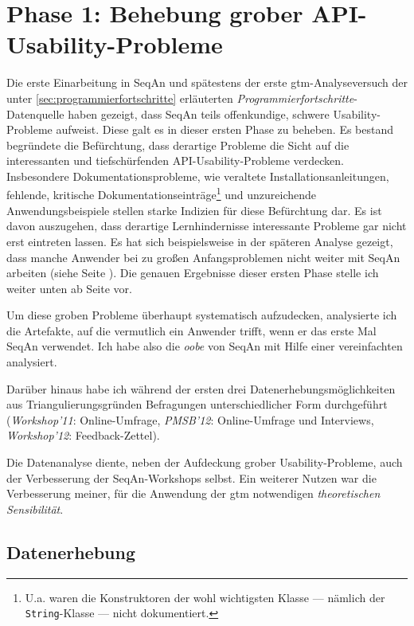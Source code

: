 \section{Phase 1: Behebung grober API-Usability-Probleme}
\label{sec:phase1}

Die erste Einarbeitung in SeqAn und spätestens der erste \gls{gtm}-Analyseversuch der unter \ref{sec:programmierfortschritte} erläuterten \textit{Programmierfortschritte}-Datenquelle haben gezeigt, dass SeqAn teils offenkundige, schwere Usability-Probleme aufweist. Diese galt es in dieser ersten Phase zu beheben. Es bestand begründete die Befürchtung, dass derartige Probleme die Sicht auf die interessanten und tiefschürfenden API-Usability-Probleme verdecken. Insbesondere Dokumentationsprobleme, wie veraltete Installationsanleitungen, fehlende, kritische Dokumentationseinträge\footnote{U.a. waren die Konstruktoren der wohl wichtigsten Klasse --- nämlich der \texttt{String}-Klasse --- nicht dokumentiert.} und unzureichende Anwendungsbeispiele stellen starke Indizien für diese Befürchtung dar. Es ist davon auszugehen, dass derartige Lernhindernisse interessante Probleme gar nicht erst eintreten lassen. Es hat sich beispielsweise in der späteren Analyse gezeigt, dass manche Anwender bei zu großen Anfangsproblemen nicht weiter mit SeqAn arbeiten (siehe Seite \pageref{sec:gt-seqan-alternative}). Die genauen Ergebnisse dieser ersten Phase stelle ich weiter unten ab Seite \pageref{sec:phase1-ergebnisse} vor.

Um diese groben Probleme überhaupt systematisch aufzudecken, analysierte ich die Artefakte, auf die vermutlich ein Anwender trifft, wenn er das erste Mal SeqAn verwendet. Ich habe also die \textit{\gls{oobe}} \citep{Fouts:2000:SLE:353360.353375} von SeqAn mit Hilfe einer vereinfachten \textit{} analysiert.

Darüber hinaus habe ich während der ersten drei Datenerhebungsmöglichkeiten aus Triangulierungsgründen Befragungen unterschiedlicher Form durchgeführt (\textit{Workshop'11}: Online-Umfrage, \textit{PMSB'12}: Online-Umfrage und Interviews, \textit{Workshop'12}: Feedback-Zettel).

Die Datenanalyse diente, neben der Aufdeckung grober Usability-Probleme, auch der Verbesserung der SeqAn-Workshops selbst. Ein weiterer Nutzen war die Verbesserung meiner, für die Anwendung der \gls{gtm} notwendigen \textit{theoretischen Sensibilität}.



\subsection{Datenerhebung}

